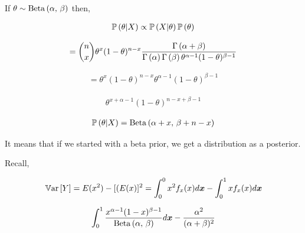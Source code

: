 \documentclass[12pt]{article}
\begin{document}
\begin{enumerate}

 If $\theta \sim \mathrm{Beta}\left(\alpha,\,\beta\right)$ then,

\begin{align*}
    \mathbb{P}\left(\theta | X\right) \propto \mathbb{P}\left(X | \theta\right) \mathbb{P}\left(\theta\right)
\end{align*}

\begin{align*}
    = {n\choose x}\theta^{x}(1-\theta)^{n-x} \frac{\Gamma\left(\alpha +\beta\right)}{\Gamma\left(\alpha\right)\Gamma\left(\beta\right)\theta^{\alpha -1}(1-\theta)^{\beta-1}}
\end{align*}

\begin{align*}
    = \theta^{x}(1 - \theta)^{n-x}\theta^{\alpha-1}(1-\theta)^{\beta-1}
\end{align*}

\begin{align*}
    \theta^{x+\alpha-1}(1-\theta)^{n-x+\beta-1}
\end{align*}

\begin{align*}
    \mathbb{P}\left(\theta|X\right) = \mathrm{Beta}\left(\alpha + x,\,\beta + n - x\right)
\end{align*}


It means that if we started with a beta prior, we get a distribution as a posterior.


Recall,

\begin{align*}
    \mathbb{V}\text{ar}\left[Y\right] = E(x^{2}) - [(E(x)]^{2} = \int_{0}^{0}{x^{2}f_{x}(x)d\boldsymbol{x}} - \int_{0}^{1}{x f_{x}(x) d\boldsymbol{x}}  
\end{align*}

\begin{align*}
    \int_{0}^{1}\frac{x^{\alpha-1}(1-x)^{\beta - 1}}{\mathrm{Beta}\left(\alpha,\,\beta\right)}d\boldsymbol{x} - \frac{\alpha^{2}}{(\alpha + \beta) ^2}
\end{align*}


\end{enumerate}
\end{document}
